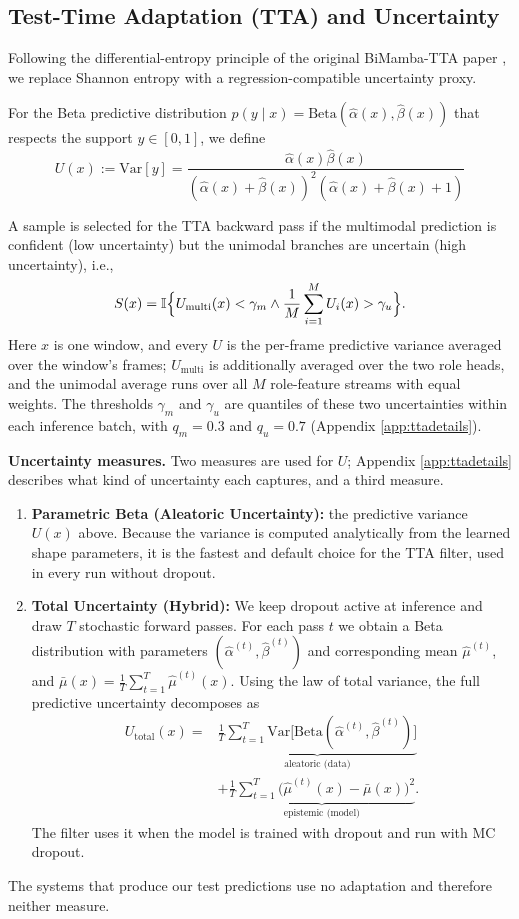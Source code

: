 \documentclass[10pt,a4paper,twocolumn]{article}
\begin{document}
	\subsection{Test-Time Adaptation (TTA) and Uncertainty}
	\label{sec:tta}
	
	Following the differential-entropy principle of the original BiMamba-TTA paper \cite{ziyu2025}, we replace Shannon entropy with a regression-compatible uncertainty proxy.
	
	For the Beta predictive distribution $p(y \mid x) = \mathrm{Beta}(\hat{\alpha}(x),\hat{\beta}(x))$ that respects the support $y \in [0,1]$, we define $$ U(x) := \mathrm{Var}[y] = \frac{\hat{\alpha}(x)\hat{\beta}(x)}{(\hat{\alpha}(x)+\hat{\beta}(x))^2(\hat{\alpha}(x)+\hat{\beta}(x)+1)} $$
	
	A sample is selected for the TTA backward pass if the multimodal prediction is confident (low uncertainty) but the unimodal branches are uncertain (high uncertainty), i.e.,
	$$
	S(x) = \mathbb{I}\Bigl\{ U_{\text{multi}}(x) < \gamma_m \land \frac{1}{M}\sum_{i=1}^M U_i(x) > \gamma_u \Bigr\}.
	$$
	Here $x$ is one window, and every $U$ is the per-frame predictive variance averaged over the window's frames; $U_{\text{multi}}$ is additionally averaged over the two role heads, and the unimodal average runs over all $M$ role-feature streams with equal weights. The thresholds $\gamma_m$ and $\gamma_u$ are quantiles of these two uncertainties within each inference batch, with $q_m = 0.3$ and $q_u = 0.7$ (Appendix \ref{app:ttadetails}).
	
	\textbf{Uncertainty measures.} Two measures are used for $U$; Appendix \ref{app:ttadetails} describes what kind of uncertainty each captures, and a third measure.
	\begin{enumerate}
		\item \textbf{Parametric Beta (Aleatoric Uncertainty):} the predictive variance $U(x)$ above. Because the variance is computed analytically from the learned shape parameters, it is the fastest and default choice for the TTA filter, used in every run without dropout.
		
		\item \textbf{Total Uncertainty (Hybrid):} We keep dropout active at inference and draw $T$ stochastic forward passes. For each pass $t$ we obtain a Beta distribution with parameters $(\hat{\alpha}^{(t)},\hat{\beta}^{(t)})$ and corresponding mean $\hat{\mu}^{(t)}$, and $\bar{\mu}(x) = \frac{1}{T}\sum_{t=1}^T \hat{\mu}^{(t)}(x)$. Using the law of total variance, the full predictive uncertainty decomposes as
		$$
		\begin{aligned}U_{\text{total}}(x) = {}&\underbrace{\frac{1}{T}\sum_{t=1}^T \mathrm{Var}\bigl[\mathrm{Beta}(\hat{\alpha}^{(t)},\hat{\beta}^{(t)})\bigr]}_{\text{aleatoric (data)}} \\
		&+ \underbrace{\frac{1}{T}\sum_{t=1}^T \bigl(\hat{\mu}^{(t)}(x) - \bar{\mu}(x)\bigr)^2}_{\text{epistemic (model)}}.\end{aligned}
		$$
		The filter uses it when the model is trained with dropout and run with MC dropout.
	\end{enumerate}
	The systems that produce our test predictions use no adaptation and therefore neither measure.
\end{document}
